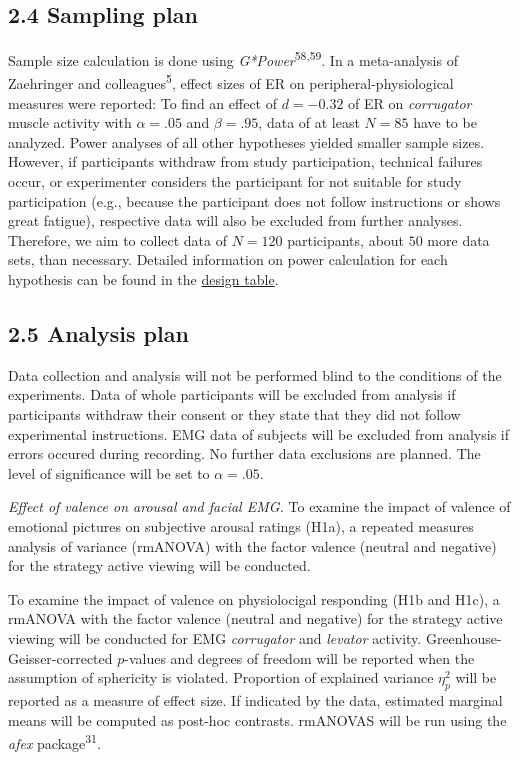 \documentclass[
  english,
  man,floatsintext]{apa6}
\begin{document}
\hypertarget{sampling-plan}{%
\subsection{2.4 Sampling plan}\label{sampling-plan}}

Sample size calculation is done using \emph{G*Power}\textsuperscript{58,59}.
In a meta-analysis of Zaehringer and colleagues\textsuperscript{5}, effect sizes of ER on peripheral-physiological measures were reported:
To find an effect of \(d=-0.32\) of ER on \emph{corrugator} muscle activity with \(\alpha=.05\) and \(\beta=.95\), data of at least \(N=85\) have to be analyzed.
Power analyses of all other hypotheses yielded smaller sample sizes.
However, if participants withdraw from study participation, technical failures occur, or experimenter considers the participant for not suitable for study participation (e.g., because the participant does not follow instructions or shows great fatigue), respective data will also be excluded from further analyses.
Therefore, we aim to collect data of \(N=120\) participants, about \(50%
\) more data sets, than necessary.
Detailed information on power calculation for each hypothesis can be found in the \protect\hyperlink{DesignTable}{design table}.

\hypertarget{analysis-plan}{%
\subsection{2.5 Analysis plan}\label{analysis-plan}}

Data collection and analysis will not be performed blind to the conditions of the experiments.
Data of whole participants will be excluded from analysis if participants withdraw their consent or they state that they did not follow experimental instructions.
EMG data of subjects will be excluded from analysis if errors occured during recording.
No further data exclusions are planned.
The level of significance will be set to \(\alpha=.05\).

\emph{Effect of valence on arousal and facial EMG.}
To examine the impact of valence of emotional pictures on subjective arousal ratings (H1a), a repeated measures analysis of variance (rmANOVA) with the factor valence (neutral and negative) for the strategy active viewing will be conducted.

To examine the impact of valence on physiolocigal responding (H1b and H1c), a rmANOVA with the factor valence (neutral and negative) for the strategy active viewing will be conducted for EMG \emph{corrugator} and \emph{levator} activity.
Greenhouse-Geisser-corrected \(p\)-values and degrees of freedom will be reported when the assumption of sphericity is violated.
Proportion of explained variance \(\eta_{p}^{2}\) will be reported as a measure of effect size.
If indicated by the data, estimated marginal means will be computed as post-hoc contrasts.
rmANOVAS will be run using the \emph{afex} package\textsuperscript{31}.
\end{document}
